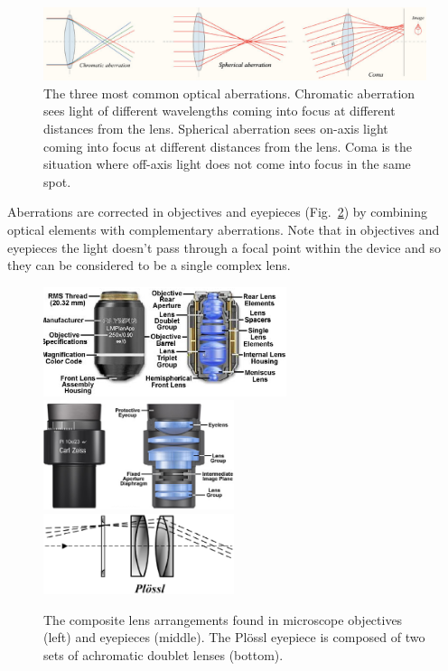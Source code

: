 \documentclass[a4paper]{report}
\begin{document}
\begin{figure}[h]
\center
\includegraphics[width=6in]{aberrations.eps}
\caption{The three most common optical aberrations. 
Chromatic aberration sees light of different wavelengths coming into focus at different distances from the lens.
Spherical aberration sees on-axis light coming into focus at different distances from the lens. 
Coma is the situation where off-axis light does not come into focus in the same spot. }
\label{fig:aberrations}
\end{figure}

Aberrations are corrected in objectives and eyepieces (Fig.~\ref{fig:composite}) by combining optical elements with complementary aberrations. 
Note that in objectives and eyepieces the light doesn't pass through a focal point within the device and so they can be considered to be a single complex lens.

\begin{figure}[h]
\center
\includegraphics[width=2.8in]{objectivesfigure1.eps}
\includegraphics[width=2.2in]{eyepieces5.eps}
\includegraphics[width=2.2in]{Plossl.eps}
\caption{The composite lens arrangements found in microscope
  objectives (left) and eyepieces (middle).
  The Pl\"{o}ssl eyepiece is composed of two sets of achromatic doublet lenses (bottom).}
\label{fig:composite}
\end{figure}
\end{document}
